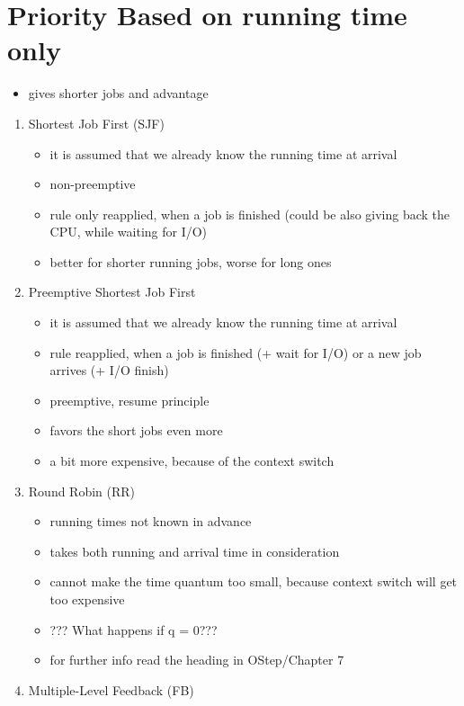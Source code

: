 \documentclass[11pt]{report}
\begin{document}
\section{Priority Based on running time only}
\label{sec:org7d8be45}
\begin{itemize}
\item gives shorter jobs and advantage
\end{itemize}
\begin{enumerate}
\item Shortest Job First (SJF)
\label{sec:org1843cbb}
\begin{itemize}
\item it is assumed that we already know the running time at arrival
\item non-preemptive
\item rule only reapplied, when a job is finished (could be also giving back the CPU, while waiting for I/O)
\item better for shorter running jobs, worse for long ones
\end{itemize}
\item Preemptive Shortest Job First
\label{sec:orgfadfd55}
\begin{itemize}
\item it is assumed that we already know the running time at arrival
\item rule reapplied, when a job is finished (+ wait for I/O) or a new job arrives (+ I/O finish)
\item preemptive, resume principle
\item favors the short jobs even more
\item a bit more expensive, because of the context switch
\end{itemize}
\item Round Robin (RR)
\label{sec:org74c80d2}
\begin{itemize}
\item running times not known in advance
\item takes both running and arrival time in consideration
\item cannot make the time quantum too small, because context switch will get too expensive
\item ??? What happens if q = 0???
\item for further info read the heading in OStep/Chapter 7
\end{itemize}
\item Multiple-Level Feedback (FB)
\label{sec:orgb3bef9c}
\begin{itemize}

\end{itemize}
\end{enumerate}
\end{document}
